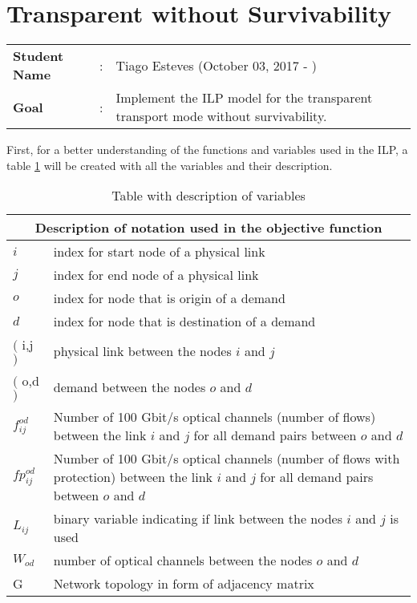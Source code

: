 \clearpage

\section{Transparent without Survivability}\label{ILP_Transp_Survivability}
\begin{tcolorbox}	
\begin{tabular}{p{2.75cm} p{0.2cm} p{10.5cm}} 	
\textbf{Student Name}  &:& Tiago Esteves    (October 03, 2017 - )\\
\textbf{Goal}          &:& Implement the ILP model for the transparent transport mode without survivability.
\end{tabular}
\end{tcolorbox}
\vspace{11pt}

First, for a better understanding of the functions and variables used in the ILP, a table \ref{description_transp} will be created with all the variables and their description.

\begin{table}[h!]
\centering
\begin{tabular}{ |p{1cm}||p{13cm}|}
 \hline
 \multicolumn{2}{|c|}{Description of notation used in the objective function} \\
 \hline
 \hline
 $i$ & index for start node of a physical link \\
 $j$ & index for end node of a physical link \\
 $o$ & index for node that is origin of a demand \\
 $d$ & index for node that is destination of a demand \\
 $($ i,j $)$ & physical link between the nodes $i$ and $j$ \\
 $($ o,d $)$ & demand between the nodes $o$ and $d$ \\
 $f_{ij}^{od}$ & Number of 100 Gbit/s optical channels (number of flows) between the link $i$ and $j$ for all demand pairs between $o$ and $d$ \\
 $fp_{ij}^{od}$ & Number of 100 Gbit/s optical channels (number of flows with protection) between the link $i$ and $j$ for all demand pairs between $o$ and $d$ \\
 $L_{ij}$ & binary variable indicating if link between the nodes $i$ and $j$ is used \\
 $W_{od}$ & number of optical channels between the nodes $o$ and $d$\\
 G & Network topology in form of adjacency matrix \\
 \hline
\end{tabular}
\caption{Table with description of variables}
\label{description_transp}
\end{table}


